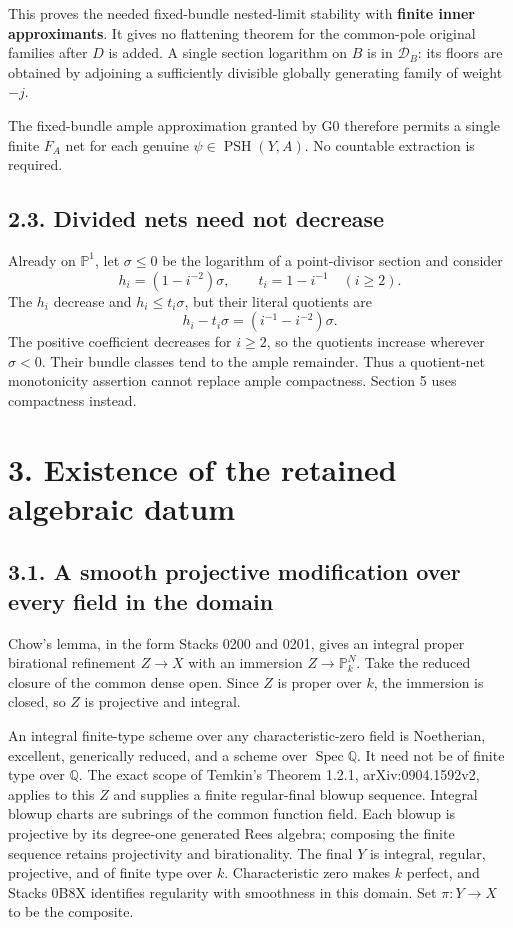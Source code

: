 \documentclass[
  10pt,
]{article}
\begin{document}
This proves the needed fixed-bundle nested-limit stability with
\textbf{finite inner approximants}. It gives no flattening theorem for
the common-pole original families after \(D\) is added. A single section
logarithm on \(B\) is in \(\mathcal D_B\): its floors are obtained by
adjoining a sufficiently divisible globally generating family of weight
\(-j\).

The fixed-bundle ample approximation granted by G0 therefore permits a
single finite \(F_A\) net for each genuine
\(\psi\in\operatorname{PSH}(Y,A)\). No countable extraction is required.

\subsection{2.3. Divided nets need not
decrease}\label{divided-nets-need-not-decrease}

Already on \(\mathbb P^1\), let \(\sigma\leq0\) be the logarithm of a
point-divisor section and consider \[
h_i=(1-i^{-2})\sigma,\qquad t_i=1-i^{-1}\quad(i\geq2).
\] The \(h_i\) decrease and \(h_i\leq t_i\sigma\), but their literal
quotients are \[h_i-t_i\sigma=(i^{-1}-i^{-2})\sigma.\] The positive
coefficient decreases for \(i\geq2\), so the quotients increase wherever
\(\sigma<0\). Their bundle classes tend to the ample remainder. Thus a
quotient-net monotonicity assertion cannot replace ample compactness.
Section 5 uses compactness instead.

\section{3. Existence of the retained algebraic
datum}\label{existence-of-the-retained-algebraic-datum}

\subsection{3.1. A smooth projective modification over every field in
the
domain}\label{a-smooth-projective-modification-over-every-field-in-the-domain}

Chow's lemma, in the form Stacks 0200 and 0201, gives an integral proper
birational refinement \(Z\to X\) with an immersion
\(Z\to\mathbb P^N_k\). Take the reduced closure of the common dense
open. Since \(Z\) is proper over \(k\), the immersion is closed, so
\(Z\) is projective and integral.

An integral finite-type scheme over any characteristic-zero field is
Noetherian, excellent, generically reduced, and a scheme over
\(\operatorname{Spec}\mathbb Q\). It need not be of finite type over
\(\mathbb Q\). The exact scope of Temkin's Theorem 1.2.1,
arXiv:0904.1592v2, applies to this \(Z\) and supplies a finite
regular-final blowup sequence. Integral blowup charts are subrings of
the common function field. Each blowup is projective by its degree-one
generated Rees algebra; composing the finite sequence retains
projectivity and birationality. The final \(Y\) is integral, regular,
projective, and of finite type over \(k\). Characteristic zero makes
\(k\) perfect, and Stacks 0B8X identifies regularity with smoothness in
this domain. Set \(\pi:Y\to X\) to be the composite.
\end{document}
